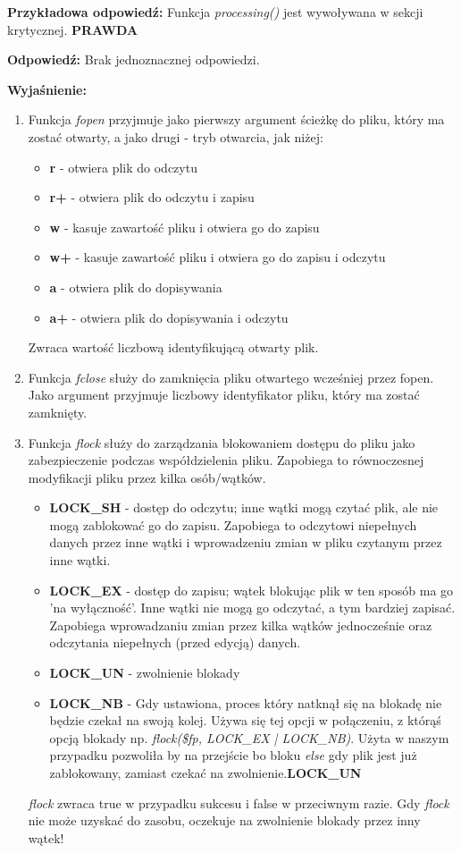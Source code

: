 \noindent
{\textbf{Przykładowa odpowiedź:}}
Funkcja \textit{processing()} jest wywoływana w sekcji krytycznej.
\textbf{PRAWDA}

\vspace{0.4cm}
\noindent
\textbf{Odpowiedź:}
Brak jednoznacznej odpowiedzi.

\vspace{0.4cm}
\noindent
\textbf{Wyjaśnienie:}

\begin{enumerate}
\item 
Funkcja \textit{fopen} przyjmuje jako pierwszy argument ścieżkę do pliku, który ma zostać otwarty, a jako drugi - tryb otwarcia, jak niżej:
\begin{itemize}
\item
\textbf{r} - otwiera plik do odczytu
\item
\textbf{r+} - otwiera plik do odczytu i zapisu
\item
\textbf{w} - kasuje zawartość pliku i otwiera go do zapisu
\item
\textbf{w+} - kasuje zawartość pliku i otwiera go do zapisu i odczytu
\item
\textbf{a} - otwiera plik do dopisywania
\item
\textbf{a+} - otwiera plik do dopisywania i odczytu
\end{itemize}
Zwraca wartość liczbową identyfikującą otwarty plik.
\item
Funkcja \textit{fclose} służy do zamknięcia pliku otwartego wcześniej przez fopen. Jako argument przyjmuje liczbowy identyfikator pliku, który ma zostać zamknięty.
\item
Funkcja \textit{flock} służy do zarządzania blokowaniem dostępu do pliku jako zabezpieczenie podczas współdzielenia pliku. Zapobiega to równoczesnej modyfikacji pliku przez kilka osób/wątków.
\begin{itemize}
\item
\textbf{LOCK\_SH} - dostęp do odczytu; inne wątki mogą czytać plik, ale nie mogą zablokować go do zapisu. Zapobiega to odczytowi niepełnych danych przez inne wątki i wprowadzeniu zmian w pliku czytanym przez inne wątki.
\item
\textbf{LOCK\_EX} - dostęp do zapisu; wątek blokując plik w ten sposób ma go 'na wyłączność'. Inne wątki nie mogą go odczytać, a tym bardziej zapisać. Zapobiega wprowadzaniu zmian przez kilka wątków jednocześnie oraz odczytania niepełnych (przed edycją) danych.
\item
\textbf{LOCK\_UN} - zwolnienie blokady 
\item
\textbf{LOCK\_NB} - Gdy ustawiona, proces który natknął się na blokadę nie będzie czekał na swoją kolej. Używa się tej opcji w połączeniu, z którąś opcją blokady np. \textit{flock(\$fp, LOCK\_EX | LOCK\_NB)}. Użyta w naszym przypadku pozwoliła by na przejście bo bloku \textit{else} gdy plik jest już zablokowany, zamiast czekać na zwolnienie.\textbf{LOCK\_UN}
\end{itemize}
\textit{flock} zwraca true w przypadku sukcesu i false w przeciwnym razie.
Gdy \textit{flock} nie może uzyskać do zasobu, oczekuje na zwolnienie blokady przez inny wątek!


\end{enumerate}
